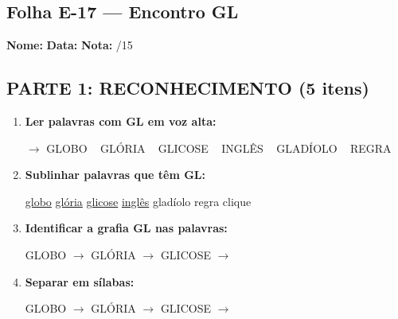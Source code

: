 \subsection{Folha E-17 --- Encontro GL}
\begin{exercicio}



\noindent\textbf{Nome:} \underline{\hspace{3.2cm}} \quad \textbf{Data:} \underline{\hspace{1.6cm}} \quad \textbf{Nota:} \underline{\hspace{0.9cm}}/15


\subsection*{PARTE 1: RECONHECIMENTO (5 itens)}

\begin{enumerate}

  \item \textbf{Ler palavras com GL em voz alta:}
  \begin{center}
  $\rightarrow$ GLOBO ~ GLÓRIA ~ GLICOSE ~ INGLÊS ~ GLADÍOLO ~ REGRA
  \end{center}

  \item \textbf{Sublinhar palavras que têm GL:}

\begin{center}
  \uline{globo} \quad \uline{glória} \quad \uline{glicose} \quad \uline{inglês} \quad gladíolo \quad regra \quad clique
\end{center}

  \item \textbf{Identificar a grafia GL nas palavras:}
  \begin{center}
  GLOBO $\rightarrow$ \underline{\hspace{1cm}} \quad GLÓRIA $\rightarrow$ \underline{\hspace{1cm}} \quad GLICOSE $\rightarrow$ \underline{\hspace{1cm}}
  \end{center}

  \item \textbf{Separar em sílabas:}
  \begin{center}
  GLOBO $\rightarrow$ \underline{\hspace{1.2cm}} \quad GLÓRIA $\rightarrow$ \underline{\hspace{1.2cm}} \quad GLICOSE $\rightarrow$ \underline{\hspace{1.2cm}}
  \end{center}


\end{enumerate}
\end{exercicio}
